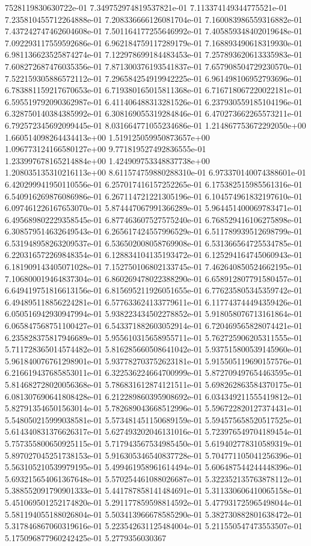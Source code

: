 7528119830630722e-01	7.349752974819537821e-01	7.113374149344775521e-01	7.235810455712264888e-01	7.208336666126081704e-01	7.160083986559316882e-01	7.437242747462604608e-01	7.501164177255646992e-01	7.405859348402019648e-01	7.092293117559592686e-01	6.962184759117289179e-01	7.168893490618319930e-01	6.981136623525874274e-01	7.122978699184483453e-01	7.257893620613335983e-01	7.608272687476035356e-01	7.871300376193541837e-01	7.657908504729230570e-01	7.522159305886572112e-01	7.296584254919942225e-01	6.961498106952793696e-01	6.783881159217670653e-01	6.719380165015811368e-01	6.716718067220022181e-01	6.595519792090362987e-01	6.411406488313281526e-01	6.237930559185104196e-01	6.328750140384385992e-01	6.308169055319284846e-01	6.470273662265573211e-01	6.792572345692099445e-01	8.031664771055234686e-01	1.214867753672292050e+00	1.660514098264434413e+00	1.519125059950873657e+00	1.096773124166580127e+00	9.771819527492836555e-01	1.233997678165214884e+00	1.424909753348837738e+00	1.208035135310216113e+00	8.611574759880288310e-01	6.973370140074388601e-01	6.420299941950110556e-01	6.257017416157252265e-01	6.175382515985561316e-01	6.540916269876086986e-01	6.267114721221305196e-01	6.104574961832197610e-01	6.097461226167653070e-01	5.874447067991366289e-01	5.964451400069783471e-01	6.495689802229358545e-01	6.877463607527575240e-01	6.768529416106275898e-01	6.308579514632649543e-01	6.265617424557996529e-01	6.511789939512698799e-01	6.531948958263209537e-01	6.536502008058769908e-01	6.531366564725534785e-01	6.220316572269848354e-01	6.128834104135193472e-01	6.125294164745060943e-01	6.181909143405071028e-01	7.152750106802133745e-01	7.462640850524662195e-01	7.106800019464837304e-01	6.860269478022388290e-01	6.658912807791580457e-01	6.649419751816613156e-01	6.815695211926051655e-01	6.776235805345359742e-01	6.494895118856224281e-01	6.577633624133779611e-01	6.117743744494359426e-01	6.050516942930947994e-01	5.938223434502278852e-01	5.918058076713161864e-01	6.065847568751100427e-01	6.543371882603052914e-01	6.720469565828074421e-01	6.235828375817946689e-01	5.955610315658955711e-01	5.762725906205311555e-01	5.711728365014574482e-01	5.816285660508641042e-01	5.937515800539145960e-01	5.961840076761298901e-01	5.937782703752623181e-01	5.915505119690157576e-01	6.216619437685853011e-01	6.322536224664700999e-01	5.872709497654463595e-01	5.814682728020056368e-01	5.786831612874121511e-01	5.698262863584370175e-01	6.081307690641808428e-01	6.212289860395908692e-01	6.034349211555419812e-01	5.827913546501563014e-01	5.782689043668512996e-01	5.596722820127374431e-01	5.548050215999038581e-01	5.573481451150689159e-01	5.594575658520517525e-01	5.614340831376626317e-01	5.627493202046131016e-01	5.723976549704189454e-01	5.757355800650925115e-01	5.717943567534985450e-01	5.619402778310589319e-01	5.897027045251738153e-01	5.916305346540837728e-01	5.704771105041256396e-01	5.563105210539979195e-01	5.499461958961614494e-01	5.606487544244448396e-01	5.693215654061367648e-01	5.570254461088026687e-01	5.322352135763878112e-01	5.388552091790901333e-01	5.441787858141484691e-01	5.311330606410065158e-01	5.451069501252174820e-01	5.291177859598814592e-01	5.477931725965498044e-01	5.581194055188026804e-01	5.503413966678585290e-01	5.382730882801638472e-01	5.317846867060319616e-01	5.223542631125484004e-01	5.211550547473553507e-01	5.175096877960242425e-01	5.2779356030367